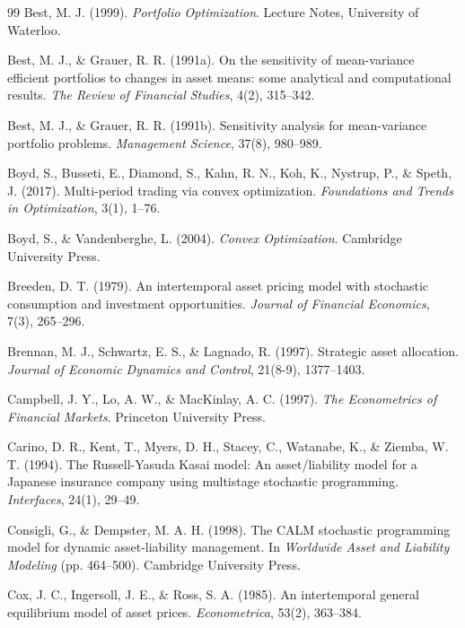 \documentclass[11pt,a4paper]{report}
\numberwithin{equation}{chapter}
\begin{document}
\begin{thebibliography}{99}
Best, M. J. (1999).
\newblock \emph{Portfolio Optimization}.
\newblock Lecture Notes, University of Waterloo.

Best, M. J., \& Grauer, R. R. (1991a).
\newblock On the sensitivity of mean-variance efficient portfolios to changes in asset means: some analytical and computational results.
\newblock \emph{The Review of Financial Studies}, 4(2), 315--342.

Best, M. J., \& Grauer, R. R. (1991b).
\newblock Sensitivity analysis for mean-variance portfolio problems.
\newblock \emph{Management Science}, 37(8), 980--989.

Boyd, S., Busseti, E., Diamond, S., Kahn, R. N., Koh, K., Nystrup, P., \& Speth, J. (2017).
\newblock Multi-period trading via convex optimization.
\newblock \emph{Foundations and Trends in Optimization}, 3(1), 1--76.

Boyd, S., \& Vandenberghe, L. (2004).
\newblock \emph{Convex Optimization}.
\newblock Cambridge University Press.

Breeden, D. T. (1979).
\newblock An intertemporal asset pricing model with stochastic consumption and investment opportunities.
\newblock \emph{Journal of Financial Economics}, 7(3), 265--296.

Brennan, M. J., Schwartz, E. S., \& Lagnado, R. (1997).
\newblock Strategic asset allocation.
\newblock \emph{Journal of Economic Dynamics and Control}, 21(8-9), 1377--1403.

Campbell, J. Y., Lo, A. W., \& MacKinlay, A. C. (1997).
\newblock \emph{The Econometrics of Financial Markets}.
\newblock Princeton University Press.

Carino, D. R., Kent, T., Myers, D. H., Stacey, C., Watanabe, K., \& Ziemba, W. T. (1994).
\newblock The Russell-Yasuda Kasai model: An asset/liability model for a Japanese insurance company using multistage stochastic programming.
\newblock \emph{Interfaces}, 24(1), 29--49.

Consigli, G., \& Dempster, M. A. H. (1998).
\newblock The CALM stochastic programming model for dynamic asset-liability management.
\newblock In \emph{Worldwide Asset and Liability Modeling} (pp. 464--500). Cambridge University Press.

Cox, J. C., Ingersoll, J. E., \& Ross, S. A. (1985).
\newblock An intertemporal general equilibrium model of asset prices.
\newblock \emph{Econometrica}, 53(2), 363--384.


\end{thebibliography}
\end{document}

